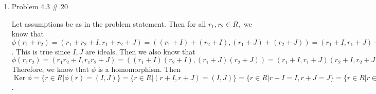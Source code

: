 \documentclass[11pt]{article}
\DeclareMathOperator{\Ker}{Ker}
\begin{document}
\begin{enumerate}
\begin{enumerate}
    \item
    
    Let assumptions be as in the problem statement. In order to show these are isomorphic we will define a mapping $\phi: R/I\rightarrow F\oplus F$ as $\phi(\begin{pmatrix}a & b \\ 0 & c \end{pmatrix}) = (a, c)$. Let us define $A = \begin{pmatrix}a_1 & b_1 \\ 0 & c_1\end{pmatrix}, B = \begin{pmatrix}a_2 & b_2 \\ 0 & c_2\end{pmatrix}\in R$. We are able to define $A$ and $B$ simply like this because the definition of $R/I = \{a + I |a\in R\}$ does not affect elements $a_1, c_1$. Then we have that $A+B = \begin{pmatrix}a_1+a_2 & b_1+b_2 \\ 0 & c_1+c_2\end{pmatrix}$ and $\phi(A+B) = (a_1+a_2, c_1+c_2) = (a_1,c_1)+(a_2,c_2) = \phi(A) + \phi(B)$ therefore, we know that $\phi$ is a homomorphism. We then want to show that $\phi$ is one to one, Let us say that $\phi(A)=\phi(B),$ that is to say that $(a_1, c_1) = (a_2,c_2).$ This implies then that $a_1=a_2, c_1=c_2.$ Then it would follow that $A=B.$ This means that $\phi$ is one to one and is therefore a monomorphism. Lastly, we want to show that $\phi$ is onto. Let us define an element of $F\oplus F$ as $(a, c)$, then the element of $R/I$ the corresponds to $(a, c)$ is $\begin{pmatrix}a & b \\ 0 & c\end{pmatrix}$. This implies that $\phi$ is onto and is therefore an isomorphism. Therefore, since we have an isomorphism $\phi: R/I\rightarrow F\oplus F$ we know that $R/I\simeq F\oplus F.$
    
\end{enumerate}

\pagebreak
\item Problem 4.3 \# 20

Let assumptions be as in the problem statement. Then for all $r_1,r_2\in R,$ we know that $\phi(r_1+r_2) = (r_1+r_2+I, r_1+r_2+J) = ((r_1+I)+(r_2+I), (r_1+J)+(r_2+J)) = (r_1+I, r_1+J)+(r_2+I,r_2+J) = \phi(r_1)+\phi(r_2)$. This is true since $I, J$ are ideals. Then we also know that $\phi(r_1r_2) = (r_1r_2+I, r_1r_2+J) = ((r_1+I)(r_2+I), (r_1+J)(r_2+J)) = (r_1+I, r_1+J)(r_2+I,r_2+J) = \phi(r_1)\phi(r_2).$ Therefore, we know that $\phi$ is a homomorphism. Then $\Ker\phi = \{r\in R|\phi(r) = (I,J)\} = \{r\in R | (r+I, r+J) = (I, J)\} = \{r\in R| r+I = I, r+ J = J\} = \{r\in R| r\in I, r\in J\} = \{r\in R| r\in I\cap J\} = I\cap J$.


\end{enumerate}
\end{document}
